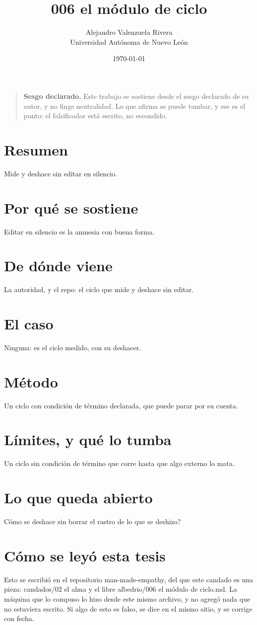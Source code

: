 \documentclass[11pt,a4paper]{article}
\title{006 el módulo de ciclo}
\author{Alejandro Valenzuela Rivera\\\small Universidad Autónoma de Nuevo León}
\date{\today}
\begin{document}
\maketitle

\begin{quote}
\textbf{Sesgo declarado.} Este trabajo se sostiene desde el sesgo declarado de su autor, y no finge neutralidad. Lo que afirma se puede tumbar, y ese es el punto: el falsificador está escrito, no escondido.
\end{quote}

\section*{Resumen}
Mide y deshace sin editar en silencio.

\section{Por qué se sostiene}
Editar en silencio es la amnesia con buena forma.

\section{De dónde viene}
La autoridad, y el repo: el ciclo que mide y deshace sin editar.

\section{El caso}
Ninguna: es el ciclo medido, con su deshacer.

\section{Método}
Un ciclo con condición de término declarada, que puede parar por su cuenta.

\section{Límites, y qué lo tumba}
Un ciclo sin condición de término que corre hasta que algo externo lo mata.

\section{Lo que queda abierto}
\textquestiondown{}Cómo se deshace sin borrar el rastro de lo que se deshizo?

\section*{Cómo se leyó esta tesis}
Esto se escribió en el repositorio man-made-empathy, del que este candado es una pieza: candados/02 el alma y el libre albedrio/006 el módulo de ciclo.md. La máquina que lo compuso lo hizo desde este mismo archivo, y no agregó nada que no estuviera escrito. Si algo de esto es falso, se dice en el mismo sitio, y se corrige con fecha.
\end{document}
